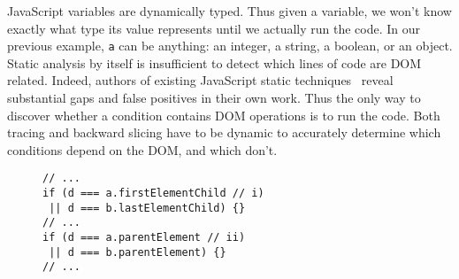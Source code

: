 JavaScript variables are dynamically typed.  Thus given a variable, we won't know exactly what type its value represents until we actually run the code.  
In our previous example, {\tt a} can be anything: an integer, a string, a boolean, or an object.  
Static analysis by itself is insufficient to detect which lines of code are DOM related.
Indeed, authors of existing JavaScript static techniques~\cite{staticJsWWW09, staticJsWWW11} reveal substantial gaps and false positives in their own work.  
Thus the only way to discover whether a condition contains DOM operations is to run the code.  Both tracing and backward slicing have to be dynamic to accurately determine which conditions depend on the DOM, and which don't.  



\begin{figure}
\begin{lstlisting}[caption=Example code showing conditions that have logical constraints interdependent with each other.  To make both of these {\tt if} statements true sub conditions i) and ii) become mutually exclusive: they cannot be true at the same time.  Thus a logic solver is required to generate a satisfiable DOM structure and HTML.,label=domOr]  
// ...
if (d === a.firstElementChild // i)
 || d === b.lastElementChild) {}
// ... 
if (d === a.parentElement // ii)
 || d === b.parentElement) {}
// ...
\end{lstlisting}
\end{figure}

